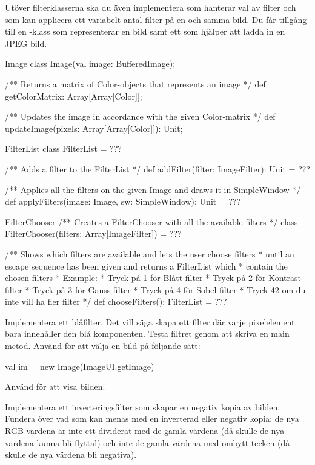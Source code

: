 Utöver filterklasserna ska du även implementera  som hanterar val av filter och  som kan applicera ett variabelt antal filter på en och samma bild. Du får tillgång till en -klass som representerar en bild samt ett  som hjälper att ladda in en JPEG bild.

\begin{ScalaSpec}{Image}
class Image(val image: BufferedImage);

/** Returns a matrix of Color-objects that represents an image */
def getColorMatrix: Array[Array[Color]];

/** Updates the image in accordance with the given Color-matrix */
def updateImage(pixels: Array[Array[Color]]): Unit;
\end{ScalaSpec}

\begin{ScalaSpec}{FilterList}
class FilterList = ???

/** Adds a filter to the FilterList */
def addFilter(filter: ImageFilter): Unit = ???
  
/** Applies all the filters on the given Image and draws it in SimpleWindow */
def applyFilters(image: Image, sw: SimpleWindow): Unit = ???
\end{ScalaSpec}

\begin{ScalaSpec}{FilterChooser}
/** Creates a FilterChooser with all the available filters */
class FilterChooser(filters: Array[ImageFilter]) = ???
  
/** Shows which filters are available and lets the user choose filters
*   until an escape sequence has been given and returns a FilterList which
*   contain the chosen filters
*   Example: 
*   Tryck på 1 för Blått-filter
*   Tryck på 2 för Kontrast-filter
*   Tryck på 3 för Gauss-filter
*   Tryck på 4 för Sobel-filter
*   Tryck 42 om du inte vill ha fler filter
*/
def chooseFilters(): FilterList = ???
\end{ScalaSpec}


\Task Implementera ett blåfilter. Det vill säga skapa ett filter där varje pixelelement bara innehåller den blå komponenten. Testa filtret genom att skriva en main metod. Använd  för att välja en bild på följande sätt:
\begin{Code}
val im = new Image(ImageUI.getImage)
\end{Code}
Använd  för att visa bilden.

\Task Implementera ett inverteringsfilter som skapar en negativ kopia av bilden. 
Fundera över vad som kan menas med en inverterad eller negativ kopia: de nya RGB-värdena är inte ett dividerat med de gamla värdena (då skulle de nya värdena kunna bli flyttal) och inte de gamla värdena med ombytt tecken (då skulle de nya värdena bli negativa).

